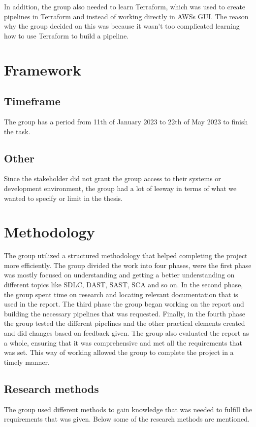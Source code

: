 In addition, the group also needed to learn Terraform, which was used to create pipelines in Terraform and instead of working directly in AWSs \gls{GUI}. The reason why the group decided on this was because it wasn't too complicated learning how to use Terraform to build a pipeline. 





\section{Framework}

\subsection{Timeframe}
The group has a period from 11th of January 2023 to 22th of May 2023 to finish the task. 

\subsection{Other}
Since the stakeholder did not grant the group access to their systems or development environment, the group had a lot of leeway in terms of what we wanted to specify or limit in the thesis.



\section{Methodology} %
The group utilized a structured methodology that helped completing the project more efficiently. The group divided the work into four phases, were the first phase was mostly focused on understanding and getting a better understanding on different topics like SDLC, DAST, SAST, SCA and so on. In the second phase, the group spent time on research and locating relevant documentation that is used in the report. The third phase the group began working on the report and building the necessary pipelines that was requested. Finally, in the fourth phase the group tested the different pipelines and the other practical elements created and did changes based on feedback given. The group also evaluated the report as a whole, ensuring that it was comprehensive and met all the requirements that was set. This way of working allowed the group to complete the project in a timely manner. 

\subsection{Research methods}
The group used different methods to gain knowledge that was needed to fulfill the requirements that was given. Below some of the research methods are mentioned. 

